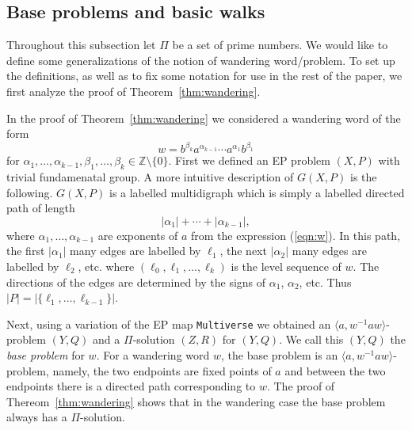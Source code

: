 \documentclass[10pt,a4paper]{amsart}
\theoremstyle{definition}
\theoremstyle{definition}
\numberwithin{equation}{section}
\begin{document}
\subsection{Base problems and basic walks\label{subsec:baseproblem}}
Throughout this subsection let $\Pi$ be a set of prime numbers. We would like to define some generalizations of the notion of wandering word/problem. To set up the definitions, as well as to fix some notation for use in the rest of the paper, we first analyze the proof of Theorem~\ref{thm:wandering}.

In the proof of Theorem~\ref{thm:wandering} we considered a wandering word of the form 
\begin{equation}\label{eqn:w} w=b^{\beta_k}a^{\alpha_{k-1}}\cdots a^{\alpha_1}b^{\beta_1} \end{equation}
for $\alpha_1,\dots, \alpha_{k-1}, \beta_1,\dots, \beta_k\in\mathbb{Z}\setminus\{0\}$. 
First we defined an EP problem $(X, P)$ with trivial fundamenatal group. A more intuitive description of $G(X, P)$ is the following. $G(X, P)$ is a labelled multidigraph which is simply a labelled directed path of length 
$$ |\alpha_1|+\cdots+|\alpha_{k-1}|, $$
where $\alpha_1, \dots, \alpha_{k-1}$ are exponents of $a$ from the expression (\ref{eqn:w}). 
In this path, the first $|\alpha_1|$ many edges are labelled by $\ell_1$, the next $|\alpha_2|$ many edges are labelled by $\ell_2$, etc. where $(\ell_0, \ell_1, \dots, \ell_k)$ is the level sequence of $w$. The directions of the edges are determined by the signs of $\alpha_1$, $\alpha_2$, etc. Thus $|P|=|\{\ell_1,\dots, \ell_{k-1}\}|$. 

Next, using a variation of the EP map {\tt Multiverse} we obtained an $\langle a, w^{-1}aw\rangle$-problem $(Y, Q)$ and a $\Pi$-solution $(Z, R)$ for $(Y, Q)$. We call this $(Y,Q)$ the {\em base problem} for $w$. For a wandering word $w$, the base problem is an $\langle a, w^{-1}aw\rangle$-problem, namely, the two endpoints are fixed points of $a$ and between the two endpoints there is a directed path corresponding to $w$. The proof of Thereom~\ref{thm:wandering} shows that in the wandering case the base problem always has a $\Pi$-solution.
\end{document}
